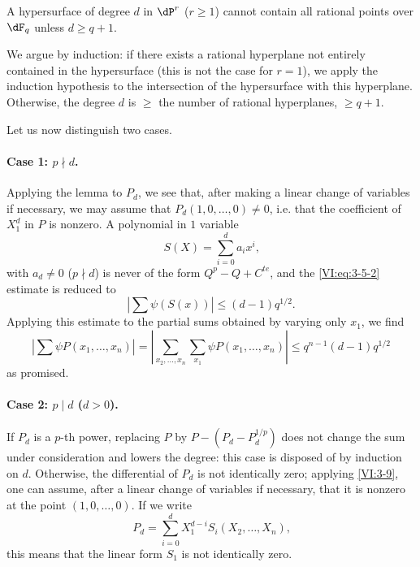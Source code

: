 \begin{lemma_}\label{VI:3-9}
A hypersurface of degree $d$ in $\dP^r$ ($r\geqslant 1$) cannot contain 
all rational points over $\dF_q$ unless $d\geqslant q+1$. 
\end{lemma_}

We argue by induction: if there exists a rational hyperplane not 
entirely contained in the hypersurface (this is not the case for $r=1$), we 
apply the induction hypothesis to the intersection of the hypersurface with this 
hyperplane. Otherwise, the degree $d$ is $\geqslant$ the number of rational 
hyperplanes, $\geqslant q+1$. 

Let us now distinguish two cases. 


\paragraph{Case 1: $p\nmid d$.}
Applying the lemma to $P_d$, we see that, after making a linear change 
of variables if necessary, we may assume that $P_d(1,0,\ldots,0)\ne 0$, i.e. 
that the coefficient of $X_1^d$ in $P$ is nonzero. A polynomial in $1$ 
variable 
\[
  S(X) = \sum_{i=0}^d a_i x^i \text{,} 
\]
with $a_d\ne 0$ ($p\nmid d$) is never of the form $Q^p-Q+C^{t e}$, and 
the \eqref{VI:eq:3-5-2} estimate is reduced to 
\[
  \left| \sum \psi(S(x)) \right| \leqslant (d-1) q^{1/2} \text{.} 
\]
Applying this estimate to the partial sums obtained by varying 
only $x_1$, we find 
\[
  \left| \sum \psi P(x_1,\dots,x_n) \right| = \left| \sum_{x_2,\dots,x_n} \sum_{x_1} \psi P(x_1,\dots,x_n)\right| \leqslant q^{n-1} (d-1) q^{1/2} 
\]
as promised. 


\paragraph{Case 2: $p\mid d$ ($d>0$).}
If $P_d$ is a $p$-th power, replacing $P$ by $P-(P_d-P_d^{1/p})$ 
does not change the sum under consideration and lowers the degree: this case 
is disposed of by induction on $d$. Otherwise, the differential of 
$P_d$ is not identically zero; applying \ref{VI:3-9}, one can assume, 
after a linear change of variables if necessary, that it is nonzero 
at the point $(1,0,\dots,0)$. If we write 
\[
  P_d = \sum_{i=0}^d X_1^{d-i} S_i(X_2,\dots,X_n) \text{,} 
\]
this means that the linear form $S_1$ is not identically zero. 

